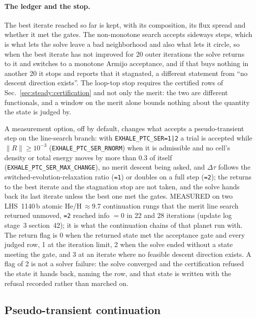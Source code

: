 \paragraph{The ledger and the stop.}
The best iterate reached so far is kept, with its composition, its flux spread
and whether it met the gates.  The non-monotone search accepts sideways steps,
which is what lets the solve leave a bad neighborhood and also what lets it
circle, so when the best iterate has not improved for 20 outer iterations the
solve returns to it and switches to a monotone Armijo acceptance, and if that
buys nothing in another 20 it stops and reports that it stagnated, a different
statement from ``no descent direction exists''.  The loop-top stop requires
the certified rows of Sec.~\ref{sec:steady:certification} and not only the
merit: the two are different functionals, and a window on the merit alone
bounds nothing about the quantity the state is judged by.

A measurement option, off by default, changes what accepts a pseudo-transient
step on the line-search branch: with \texttt{EXHALE\_PTC\_SER=1|2} a trial is
accepted while $\|R\| \ge 10^{-3}$ (\texttt{EXHALE\_PTC\_SER\_RNORM}) when it
is admissible and no cell's density or total energy moves by more than 0.3 of
itself (\texttt{EXHALE\_PTC\_SER\_MAX\_CHANGE}), no merit descent being asked,
and $\Delta\tau$ follows the switched-evolution-relaxation ratio (\texttt{=1})
or doubles on a full step (\texttt{=2}); the returns to the best iterate and
the stagnation stop are not taken, and the solve hands back its last iterate
unless the best one met the gates.  MEASURED on two LHS~1140\,b atomic
He/H\,$\approx9.7$ continuation rungs that the merit line search returned
unmoved, \texttt{=2} reached info $=0$ in 22 and 28 iterations (update log
stage~3 section~42); it is what the continuation chains of that planet run
with.  The return flag is
0 when the returned state met the acceptance gate and every judged row, 1 at
the iteration limit, 2 when the solve ended without a state meeting the gate,
and 3 at an iterate where no feasible descent direction exists.  A flag of 2
is not a solver failure: the solve converged and the certification refused the
state it hands back, naming the row, and that state is written with the
refusal recorded rather than marched on.

\subsection{Pseudo-transient continuation}
\label{sec:steady:ptc}

